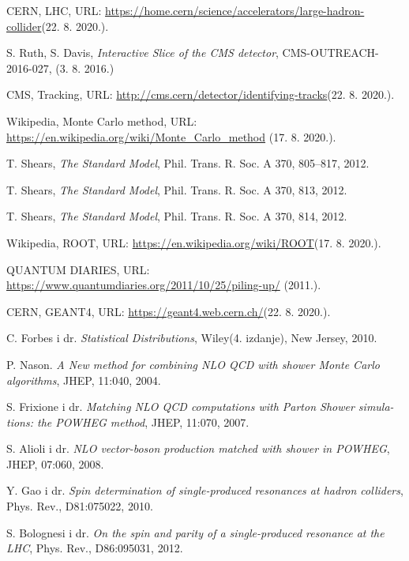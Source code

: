 \documentclass[12pt,a4paper,oneside]{article}
\begin{document}
\begin{linenumbers}
{\begin{thebibliography}{99}
				
				CERN, LHC, URL: \url{https://home.cern/science/accelerators/large-hadron-collider}(22. 8. 2020.).
				
				S. Ruth, S. Davis, \textit{Interactive Slice of the CMS detector}, CMS-OUTREACH-2016-027, (3. 8. 2016.) 
				
				
				CMS, Tracking, URL: \url{http://cms.cern/detector/identifying-tracks}(22. 8. 2020.).
				
				
				Wikipedia, Monte Carlo method, URL: \url{https://en.wikipedia.org/wiki/Monte_Carlo_method} (17. 8. 2020.).
				
				
				T. Shears, \textit{The Standard Model}, Phil. Trans. R. Soc. A 370, 805–817, 2012.
				
				T. Shears, \textit{The Standard Model}, Phil. Trans. R. Soc. A 370, 813, 2012.
				
				T. Shears, \textit{The Standard Model}, Phil. Trans. R. Soc. A 370, 814, 2012.
				
				Wikipedia, ROOT, URL: \url{https://en.wikipedia.org/wiki/ROOT}(17. 8. 2020.).
				
				
				QUANTUM DIARIES, URL: \url{https://www.quantumdiaries.org/2011/10/25/piling-up/} (2011.).
				
				
				CERN, GEANT4, URL: \url{https://geant4.web.cern.ch/}(22. 8. 2020.).
				

				C. Forbes i dr. \textit{Statistical Distributions}, Wiley(4. izdanje), New Jersey, 2010.
				
				P. Nason. \textit{A New method for combining NLO QCD with shower Monte Carlo
				algorithms}, JHEP, 11:040, 2004.
				
				S. Frixione i dr. \textit{Matching NLO QCD computations with Parton Shower simula-
				tions: the POWHEG method}, JHEP, 11:070, 2007.
				
				S. Alioli i dr. \textit{NLO vector-boson production matched with shower in POWHEG},
				JHEP, 07:060, 2008.
				
				Y. Gao i dr. \textit{Spin determination of single-produced resonances at hadron colliders}, Phys. Rev., D81:075022, 2010.
				
				S. Bolognesi i dr. \textit{On the spin and parity of a single-produced resonance at the
				LHC}, Phys. Rev., D86:095031, 2012.
				

\end{thebibliography}}
\end{linenumbers}
\end{document}

